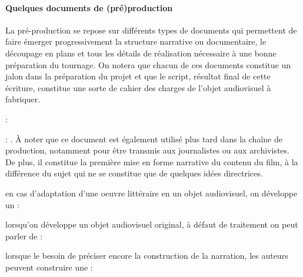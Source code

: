 \paragraph{Quelques documents de (pré)production}
La pré-production se repose sur différents types de documents qui permettent de faire émerger progressivement la structure narrative ou documentaire, le découpage en plans et tous les détails de réalisation nécessaire à une bonne préparation du tournage. 
On notera que chacun de ces documents constitue un jalon dans la préparation du projet et que le script, résultat final de cette écriture, constitue une sorte de cahier des charges de l'objet audiovisuel à fabriquer.
\begin{liste}
	\item {} :  
	
	\item {} : . 
	À noter que ce document est également utilisé plus tard dans la chaîne de production, notamment pour être transmis aux journalistes ou aux archivistes.
	De plus, il constitue la première mise en forme narrative du contenu du film, à la différence du sujet qui ne se constitue que de quelques idées directrices. 

	\item en cas d'adaptation d'une oeuvre littéraire en un objet audiovisuel, on développe un  : 

	\item lorsqu'on développe un objet audiovisuel original, à défaut de traitement on peut parler de  :

	\item lorsque le besoin de préciser encore la construction de la narration, les auteurs peuvent construire une  : 


\end{liste}
